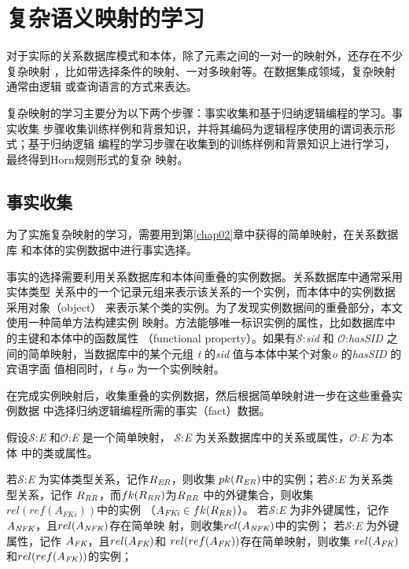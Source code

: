 \chapter{复杂语义映射的学习}
\label{chap03}

对于实际的关系数据库模式和本体，除了元素之间的一对一的映射外，还存在不少复杂映射
，比如带选择条件的映射、一对多映射等。在数据集成领域，复杂映射通常由逻辑
\cite{16}或查询语言\cite{17}的方式来表达。

复杂映射的学习主要分为以下两个步骤：事实收集和基于归纳逻辑编程的学习。事实收集
步骤收集训练样例和背景知识，并将其编码为逻辑程序使用的谓词表示形式；基于归纳逻辑
编程的学习步骤在收集到的训练样例和背景知识上进行学习，最终得到Horn规则形式的复杂
映射。

\section{事实收集}
为了实施复杂映射的学习，需要用到第\ref{chap02}章中获得的简单映射，在关系数据库
和本体的实例数据中进行事实选择。

事实的选择需要利用关系数据库和本体间重叠的实例数据。关系数据库中通常采用实体类型
关系中的一个记录元组来表示该关系的一个实例，而本体中的实例数据采用对象（object）
来表示某个类的实例。为了发现实例数据间的重叠部分，本文使用一种简单方法构建实例
映射。方法能够唯一标识实例的属性，比如数据库中的主键和本体中的函数属性
（functional property）。如果有$\mathcal{S}$:\emph{sid} 和
$\mathcal{O}$:\emph{hasSID} 之间的简单映射，当数据库中的某个元组
\emph{t} 的\emph{sid} 值与本体中某个对象\emph{o} 的\emph{hasSID} 的宾语字面
值相同时，\emph{t} 与\emph{o} 为一个实例映射。

在完成实例映射后，收集重叠的实例数据，然后根据简单映射进一步在这些重叠实例数据
中选择归纳逻辑编程所需的事实（fact）数据。

假设$\mathcal{S}$:\emph{E} 和$\mathcal{O}$:\emph{E} 是一个简单映射，
$\mathcal{S}$:\emph{E} 为关系数据库中的关系或属性，$\mathcal{O}$:\emph{E} 为本体
中的类或属性。

若$\mathcal{S}$:\emph{E} 为实体类型关系，记作$R_{\emph{ER}}$，则收集
$pk(R_{\emph{ER}} )$中的实例；若$\mathcal{S}$:\emph{E} 为关系类型关系，记作
$R_{\emph{RR}}$，而$fk(R_{\emph{RR}})$为$R_{\emph{RR}} $
中的外键集合，则收集$rel(ref(A_{FKi}))$中的实例
（$A_{\emph{FKi}} \in fk(R_{\emph{RR}})$）。
若$\mathcal{S}$:\emph{E} 为非外键属性，记作
$A_{\emph{NFK}}$，且$rel(A_{\emph{NFK}} )$存在简单映
射，则收集$rel(A_{\emph{NFK}})$中的实例；
若$\mathcal{S}$:\emph{E} 为外键属性，记作
$A_{\emph{FK}}$，且$rel(A_{\emph{FK}} )$和
$rel(ref(A_{\emph{FK}}))$存在简单映射，则收集
$rel(A_{\emph{FK}})$和$rel(ref(A_{\emph{FK}}))$的实例；



